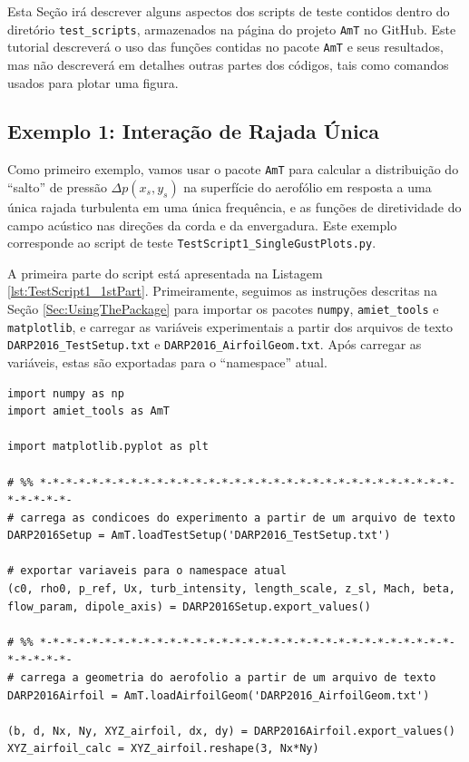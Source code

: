\documentclass[a4paper, 11pt, twoside]{article}
\newcommand{\AmT}{\texttt{AmT}}
\begin{document}
Esta Seção irá descrever alguns aspectos dos scripts de teste contidos dentro do diretório \verb|test_scripts|, armazenados na página do projeto \AmT{} no GitHub. Este tutorial descreverá o uso das funções contidas no pacote \AmT{} e seus resultados, mas não descreverá em detalhes outras partes dos códigos, tais como comandos usados para plotar uma figura.

\subsection{Exemplo 1: Interação de Rajada Única}

Como primeiro exemplo, vamos usar o pacote \AmT{} para calcular a distribuição do ``salto'' de pressão $\Delta p(x_s, y_s)$ na superfície do aerofólio em resposta a uma única rajada turbulenta em uma única frequência, e as funções de diretividade do campo acústico nas direções da corda e da envergadura. Este exemplo corresponde ao script de teste \verb|TestScript1_SingleGustPlots.py|.

A primeira parte do script está apresentada na Listagem \ref{lst:TestScript1_1stPart}. Primeiramente, seguimos as instruções descritas na Seção \ref{Sec:UsingThePackage} para importar os pacotes \verb|numpy|, \verb|amiet_tools| e \verb|matplotlib|, e carregar as variáveis experimentais a partir dos arquivos de texto \verb|DARP2016_TestSetup.txt| e \verb|DARP2016_AirfoilGeom.txt|. Após carregar as variáveis, estas são exportadas para o ``namespace'' atual. 

\begin{lstlisting}[caption={Script de teste 1 - início},label={lst:TestScript1_1stPart}]
import numpy as np
import amiet_tools as AmT

import matplotlib.pyplot as plt

# %% *-*-*-*-*-*-*-*-*-*-*-*-*-*-*-*-*-*-*-*-*-*-*-*-*-*-*-*-*-*-*-*-*-*-*-*-*-
# carrega as condicoes do experimento a partir de um arquivo de texto
DARP2016Setup = AmT.loadTestSetup('DARP2016_TestSetup.txt')

# exportar variaveis para o namespace atual
(c0, rho0, p_ref, Ux, turb_intensity, length_scale, z_sl, Mach, beta,
flow_param, dipole_axis) = DARP2016Setup.export_values()

# %% *-*-*-*-*-*-*-*-*-*-*-*-*-*-*-*-*-*-*-*-*-*-*-*-*-*-*-*-*-*-*-*-*-*-*-*-*-
# carrega a geometria do aerofolio a partir de um arquivo de texto
DARP2016Airfoil = AmT.loadAirfoilGeom('DARP2016_AirfoilGeom.txt')

(b, d, Nx, Ny, XYZ_airfoil, dx, dy) = DARP2016Airfoil.export_values()
XYZ_airfoil_calc = XYZ_airfoil.reshape(3, Nx*Ny)
\end{lstlisting}
\end{document}
